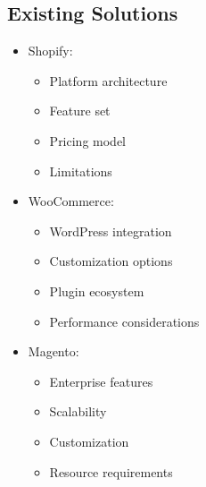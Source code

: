 \subsection{Existing Solutions}
\begin{itemize}
    \item Shopify:
    \begin{itemize}
        \item Platform architecture
        \item Feature set
        \item Pricing model
        \item Limitations
    \end{itemize}
    \item WooCommerce:
    \begin{itemize}
        \item WordPress integration
        \item Customization options
        \item Plugin ecosystem
        \item Performance considerations
    \end{itemize}
    \item Magento:
    \begin{itemize}
        \item Enterprise features
        \item Scalability
        \item Customization
        \item Resource requirements
    \end{itemize}
\end{itemize}

